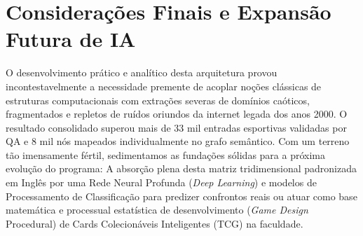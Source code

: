 \documentclass[12pt,a4paper]{article}
\begin{document}
\section{Considerações Finais e Expansão Futura de IA}
O desenvolvimento prático e analítico desta arquitetura provou incontestavelmente a necessidade premente de acoplar noções clássicas de estruturas computacionais com extrações severas de domínios caóticos, fragmentados e repletos de ruídos oriundos da internet legada dos anos 2000.
O resultado consolidado superou mais de 33 mil entradas esportivas validadas por QA e 8 mil nós mapeados individualmente no grafo semântico.
Com um terreno tão imensamente fértil, sedimentamos as fundações sólidas para a próxima evolução do programa: A absorção plena desta matriz tridimensional padronizada em Inglês por uma Rede Neural Profunda (\textit{Deep Learning}) e modelos de Processamento de Classificação para predizer confrontos reais ou atuar como base matemática e processual estatística de desenvolvimento (\textit{Game Design} Procedural) de Cards Colecionáveis Inteligentes (TCG) na faculdade.
\end{document}
